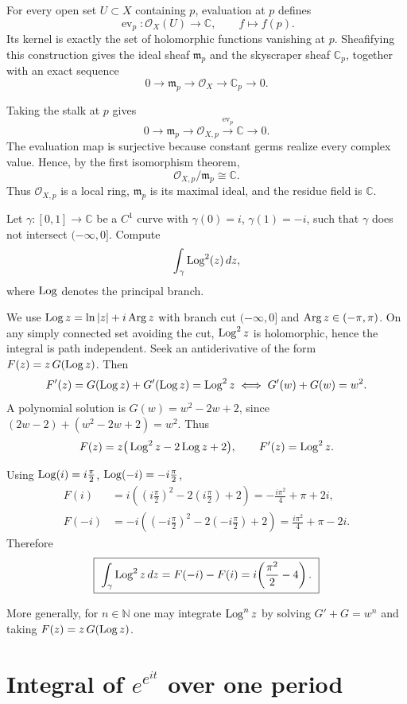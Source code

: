 \begin{solution}
For every open set \(U\subset X\) containing \(p\), evaluation at \(p\) defines
\[
\operatorname{ev}_p:\mathcal O_X(U)\longrightarrow\mathbb C,
\qquad
f\longmapsto f(p).
\]
Its kernel is exactly the set of holomorphic functions vanishing at \(p\). Sheafifying this construction gives the ideal sheaf \(\mathfrak m_p\) and the skyscraper sheaf \(\mathbb C_p\), together with an exact sequence
\[
0\longrightarrow\mathfrak m_p
\longrightarrow\mathcal O_X
\longrightarrow\mathbb C_p
\longrightarrow0.
\]

Taking the stalk at \(p\) gives
\[
0\longrightarrow\mathfrak m_{p}
\longrightarrow\mathcal O_{X,p}
\xrightarrow{\operatorname{ev}_p}
\mathbb C
\longrightarrow0.
\]
The evaluation map is surjective because constant germs realize every complex value. Hence, by the first isomorphism theorem,
\[
\mathcal O_{X,p}/\mathfrak m_p\cong\mathbb C.
\]
Thus \(\mathcal O_{X,p}\) is a local ring, \(\mathfrak m_p\) is its maximal ideal, and the residue field is \(\mathbb C\).
\end{solution}


\begin{problem}[CP-IV-0051]
\label{prob:cp-iv-0051}
Let $\gamma:[0,1]\to\mathbb C$ be a $C^1$ curve with $\gamma(0)=i$, $\gamma(1)=-i$,
	such that $\gamma$ does not intersect $(-\infty,0]$. Compute
	\[
	\int_{\gamma}\operatorname{Log}^2(z)\,dz,
	\]
	where $\operatorname{Log}$ denotes the principal branch.

	We use $\operatorname{Log} z=\ln|z|+i\operatorname{Arg} z$ with branch cut $(-\infty,0]$ and $\operatorname{Arg} z\in(-\pi,\pi)$.
	On any simply connected set avoiding the cut, $\operatorname{Log}^2 z$ is holomorphic, hence the integral
	is path independent. Seek an antiderivative of the form $F(z)=z\,G(\operatorname{Log} z)$. Then
	\[
	F'(z)=G(\operatorname{Log} z)+G'(\operatorname{Log} z)=\operatorname{Log}^2 z
	\iff
	G'(w)+G(w)=w^2.
	\]
	A polynomial solution is $G(w)=w^2-2w+2$, since $(2w-2)+(w^2-2w+2)=w^2$.
	Thus
	\[
	F(z)=z\big(\operatorname{Log}^2 z-2\operatorname{Log} z+2\big),\qquad F'(z)=\operatorname{Log}^2 z.
	\]

	Using $\operatorname{Log}(i)=i\frac{\pi}{2}$, $\operatorname{Log}(-i)=-i\frac{\pi}{2}$,
	\[
	\begin{aligned}
		F(i)&=i\!\left(\left(i\frac{\pi}{2}\right)^{2}-2\left(i\frac{\pi}{2}\right)+2\right)
		=-\frac{i\pi^{2}}{4}+\pi+2i,\\[2mm]
		F(-i)&=-i\!\left(\left(-i\frac{\pi}{2}\right)^{2}-2\left(-i\frac{\pi}{2}\right)+2\right)
		=\frac{i\pi^{2}}{4}+\pi-2i.
	\end{aligned}
	\]
	Therefore
	\[
	\boxed{\ \displaystyle \int_{\gamma}\Log^{2}z\,dz
		=F(-i)-F(i)= i\!\left(\frac{\pi^{2}}{2}-4\right). \ }
	\]

	More generally, for $n\in\mathbb N$ one may integrate $\operatorname{Log}^{n}z$ by solving
	$G'+G=w^{n}$ and taking $F(z)=z\,G(\operatorname{Log} z)$.

\section*{Integral of $e^{e^{it}}$ over one period}
\end{problem}

